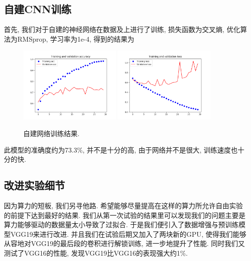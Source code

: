 \documentclass[lang=cn,11pt]{elegantpaper}
\begin{document}
\subsection{自建CNN训练}
首先, 我们对于自建的神经网络在数据及上进行了训练, 损失函数为交叉熵, 优化算法为RMSprop, 学习率为1e-4, 得到的结果为
\begin{figure}[htbp]
	\centering
	  \includegraphics[width=0.45\textwidth]{small_without_aug_1}
	  \includegraphics[width=0.45\textwidth]{small_without_aug_2}
	  \caption{自建网络训练结果.}
\end{figure}

此模型的准确度约为73.3\%, 并不是十分的高, 由于网络并不是很大, 训练速度也十分的快. 
\subsection{改进实验细节}

因为算力的短板, 我们另寻他路. 希望能够尽量提高在这样的算力所允许自由实验的前提下达到最好的结果. 我们从第一次试验的结果里可以发现我们的问题主要是算力能够驱动的数据量太小导致了过拟合. 于是我们便引入了数据增强与预训练模型VGG19来进行改进. 并且我们在试验后期又加入了两块新的GPU, 使得我们能够从容地对VGG19的最后段的卷积进行解锁训练, 进一步地提升了性能. 同时我们又测试了VGG16的性能, 发现VGG19比VGG16的表现强大约1\%. 
\end{document}

